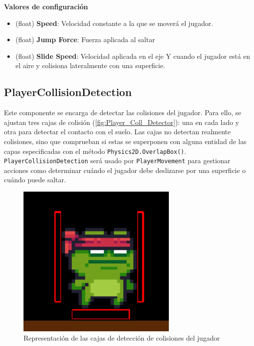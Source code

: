 \textbf{Valores de configuración}
\begin{itemize}
	\item (float) \textbf{Speed}: Velocidad constante a la que se moverá el jugador.
	\item (float) \textbf{Jump Force}: Fuerza aplicada al saltar
	\item (float) \textbf{Slide Speed}: Velocidad aplicada en el eje Y cuando el jugador está en el aire y colisiona lateralmente con una superficie.
\end{itemize}

\subsection{PlayerCollisionDetection}

Este componente se encarga de detectar las colisiones del jugador. Para ello, se ajustan tres cajas de colisión (\autoref{fig:Player_Coll_Detector}): una en cada lado y otra para detectar el contacto con el suelo. Las cajas no detectan realmente colisiones, sino que comprueban si estas se superponen con alguna entidad de las capas especificadas con el método \texttt{Physics2D.OverlapBox()}.\\

\texttt{PlayerCollisionDetection} será usado por \texttt{PlayerMovement} para gestionar acciones como determinar cuándo el jugador debe deslizarse por una superficie o cuándo puede saltar.\\

\begin{figure}[t]
	\centering
	\includegraphics[width = 0.7\textwidth]{Imagenes/CollDetector.png}
	\caption{Representación de las cajas de detección de colisiones del jugador}
	\label{fig:Player_Coll_Detector}
\end{figure}

